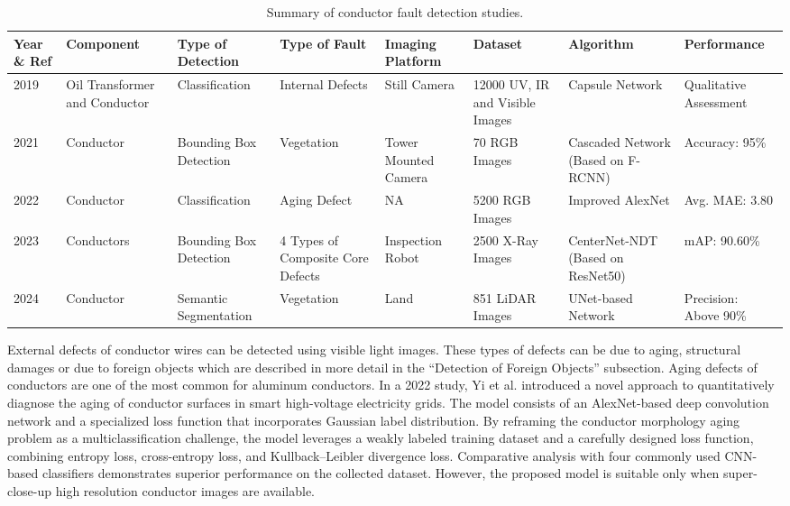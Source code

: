 \begin{table*}[htb]
\scriptsize
\caption{Summary of conductor fault detection studies.}
\label{tab:conductor_faults}
\begin{tabular}{P{.05} P{.1} P{.1} P{.1} P{.1} P{.15} P{.1} P{.1}}    

\hline  
Year \& Ref & Component & Type of Detection & Type of Fault & Imaging Platform & Dataset & Algorithm & Performance \\ 
\hline 

2019 \cite{li_image_2019} & Oil Transformer and Conductor & Classification & Internal Defects & Still Camera & 12000 UV, IR and Visible Images & Capsule Network & Qualitative Assessment \\

2021 \cite{rong_intelligent_2021} & Conductor & Bounding Box Detection & Vegetation & Tower Mounted Camera & 70 RGB Images & Cascaded Network (Based on F-RCNN) & Accuracy: 95\% \\

2022 \cite{yi_intelligent_2022} & Conductor & Classification & Aging Defect & NA & 5200 RGB Images & Improved AlexNet & Avg. MAE: 3.80 \\

2023 \cite{wang_internal_2023} & Conductors & Bounding Box Detection & 4 Types of Composite Core Defects & Inspection Robot & 2500 X-Ray Images & CenterNet-NDT (Based on ResNet50) & mAP: 90.60\% \\

2024 \cite{bergmann2024approach} & Conductor & Semantic Segmentation & Vegetation & Land & 851 LiDAR Images & UNet-based Network & Precision: Above 90\% \\
\hline

\end{tabular}
\end{table*}

External defects of conductor wires can be detected using visible light images. These types of defects can be due to aging, structural damages or due to foreign objects which are described in more detail in the “Detection of Foreign Objects” subsection. Aging defects of conductors are one of the most common for aluminum conductors.  In a 2022 study, Yi et al. \cite{yi_intelligent_2022} introduced a novel approach to quantitatively diagnose the aging of conductor surfaces in smart high-voltage electricity grids. The model consists of an AlexNet-based deep convolution network and a specialized loss function that incorporates Gaussian label distribution. By reframing the conductor morphology aging problem as a multiclassification challenge, the model leverages a weakly labeled training dataset and a carefully designed loss function, combining entropy loss, cross-entropy loss, and Kullback–Leibler divergence loss. Comparative analysis with four commonly used CNN-based classifiers demonstrates superior performance on the collected dataset. However, the proposed model is suitable only when super-close-up high resolution conductor images are available.


